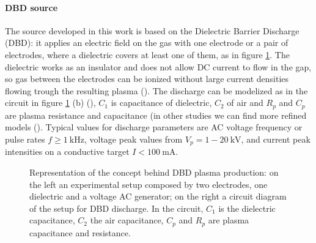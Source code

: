 \paragraph{DBD source}
The source developed in this work is based on the Dielectric Barrier Discharge (DBD): it applies an electric field on the gas with one electrode or a pair of electrodes, where a dielectric covers at least one of them, as in figure \ref{fig:DBDex}.
The dielectric works as an insulator and does not allow DC current to flow in the gap, so gas between the electrodes can be ionized without large current densities flowing trough the resulting plasma (\cite{Kogelschatz2003}). The discharge can be modelized as in the circuit in figure \ref{fig:DBDex} (b) (\cite{DBDcircuit}), $C_1$ is capacitance of dielectric, $C_2$ of air and $R_p$ and $C_p$ are plasma resistance and capacitance (in other studies we can find more refined models (\cite{doi:10.1063/1.4986023}). Typical values for discharge parameters are AC voltage frequency or pulse rates $f \ge \SI{1}{\kilo\hertz}$, voltage peak values from $V_{p} = 1 - \SI{20}{\kilo\volt}$, and current peak intensities on a conductive target $I < \SI{100}{\milli\ampere}$.
\begin{figure}
 \centering
 \hfill
 \caption{Representation of the concept behind DBD plasma production: on the left  an experimental setup composed by two electrodes, one dielectric and a voltage AC generator; on the right a circuit diagram of the setup for DBD discharge. In the circuit, $C_1$ is the dielectric capacitance, $C_2$ the air capacitance, $C_p$ and $R_p$ are plasma capacitance and resistance.}
 \label{fig:DBDex}
\end{figure}

